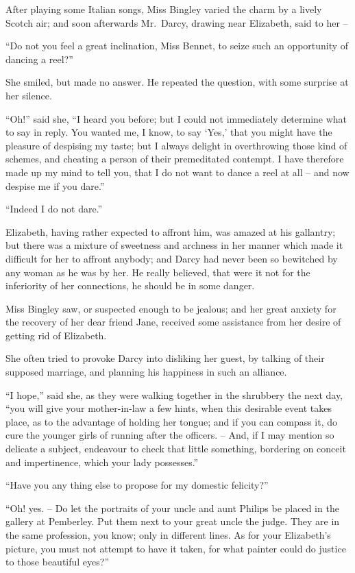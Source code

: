 After playing some Italian songs, Miss Bingley varied
the charm by a lively Scotch air; and soon afterwards
Mr.\ Darcy, drawing near Elizabeth, said to her --

“Do not you feel a great inclination, Miss Bennet, to
seize such an opportunity of dancing a reel?”

She smiled, but made no answer. He repeated the
question, with some surprise at her silence.

“Oh!” said she, “I heard you before; but I could not
immediately determine what to say in reply. You wanted
me, I know, to say ‘Yes,’ that you might have the pleasure
of despising my taste; but I always delight in overthrowing
those kind of schemes, and cheating a person of their
premeditated contempt. I have therefore made up my
mind to tell you, that I do not want to dance a reel at all -- and
now despise me if you dare.”

“Indeed I do not dare.”

Elizabeth, having rather expected to affront him, was
amazed at his gallantry; but there was a mixture of
sweetness and archness in her manner which made it
difficult for her to affront anybody; and Darcy had never
been so bewitched by any woman as he was by her. He
really believed, that were it not for the inferiority of her
connections, he should be in some danger.

Miss Bingley saw, or suspected enough to be jealous;
and her great anxiety for the recovery of her dear friend
Jane, received some assistance from her desire of getting
rid of Elizabeth.

She often tried to provoke Darcy into disliking her
guest, by talking of their supposed marriage, and planning
his happiness in such an alliance.

“I hope,” said she, as they were walking together in
the shrubbery the next day, “you will give your mother-in-law
a few hints, when this desirable event takes place,
as to the advantage of holding her tongue; and if you
can compass it, do cure the younger girls of running after
the officers. -- And, if I may mention so delicate a subject,
endeavour to check that little something, bordering on
conceit and impertinence, which your lady possesses.”

“Have you any thing else to propose for my domestic
felicity?”

“Oh! yes. -- Do let the portraits of your uncle and aunt
Philips be placed in the gallery at Pemberley. Put them
next to your great uncle the judge. They are in the
same profession, you know; only in different lines. As for
your Elizabeth’s picture, you must not attempt to have it
taken, for what painter could do justice to those beautiful
eyes?”

